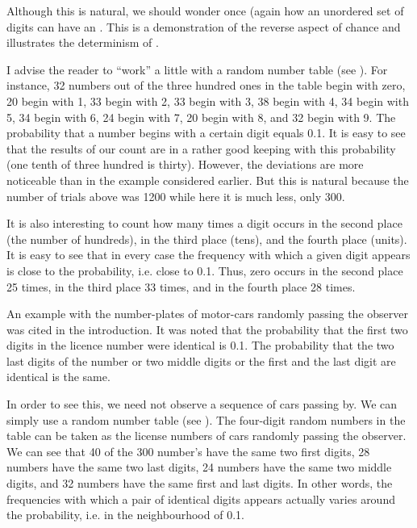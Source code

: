 Although this is natural, we should wonder once (again how an
unordered set of  digits can have an . This is a demonstration of the reverse aspect of chance and illustrates the
determinism of .

I advise the reader to ``work'' a little with a random number table (see
). For instance, 32 numbers out of the three hundred ones in the table begin with zero, 20 begin with 1, 33 begin with 2, 33 begin with 3,
38 begin with 4, 34 begin with 5, 34 begin with 6, 24 begin with 7, 20
begin with 8, and 32 begin with 9. The probability that a number begins
with a certain digit equals 0.1. It is easy to see that the results of our
count are in a rather good keeping with this probability (one tenth of
three hundred is thirty). However, the deviations are more noticeable
than in the example considered earlier. But this is natural because the
number of trials above was 1200 while here it is much less, only 300.

It is also interesting to count how many times a digit occurs in the
second place (the number of hundreds), in the third place (tens), and the
fourth place (units). It is easy to see that in every case the frequency
with which a given digit appears is close to the probability, i.e. close to
0.1. Thus, zero occurs in the second place 25 times, in the third place 33
times, and in the fourth place 28 times.

An example with the number-plates of motor-cars randomly passing
the observer was cited in the introduction. It was noted that the
probability that the first two digits in the licence number were identical
is 0.1. The probability that the two last digits of the number or two
middle digits or the ﬁrst and the last digit are identical is the same.



In order to see this, we need not observe a sequence of cars passing
by. We can simply use a random number table (see ). The four-digit random numbers in the table can be taken as the license numbers
of cars randomly passing the observer. We can see that 40 of the 300
number's have the same two ﬁrst digits, 28 numbers have the same two
last digits, 24 numbers have the same two middle digits, and 32
numbers have the same ﬁrst and last digits. In other words, the
frequencies with which a pair of identical digits appears actually
varies around the probability, i.e. in the neighbourhood of 0.1.




